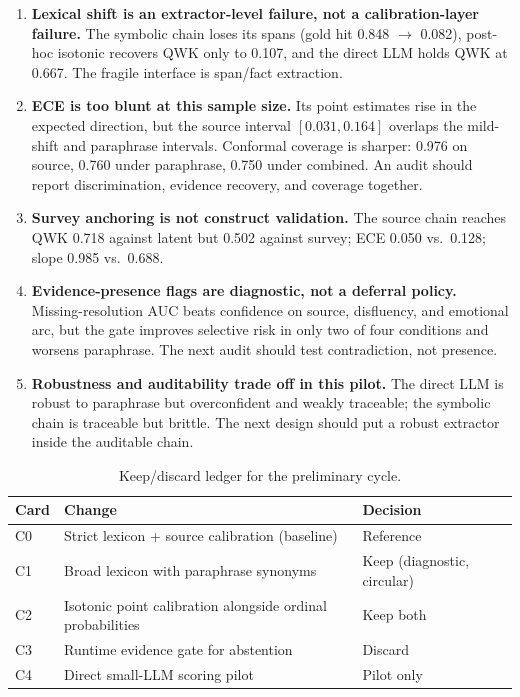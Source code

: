\documentclass[11pt,a4paper]{article}
\begin{document}
\begin{enumerate}[leftmargin=1.4em,itemsep=0.3em]
\item \textbf{Lexical shift is an extractor-level failure, not a calibration-layer failure.}
The symbolic chain loses its spans (gold hit 0.848 $\rightarrow$ 0.082), post-hoc isotonic
recovers QWK only to 0.107, and the direct LLM holds QWK at 0.667. The fragile interface is
span/fact extraction.
\item \textbf{ECE is too blunt at this sample size.} Its point estimates rise in the expected
direction, but the source interval $[0.031,0.164]$ overlaps the mild-shift and paraphrase
intervals. Conformal coverage is sharper: 0.976 on source, 0.760 under paraphrase, 0.750 under
combined. An audit should report discrimination, evidence recovery, and coverage together.
\item \textbf{Survey anchoring is not construct validation.} The source chain reaches QWK 0.718
against latent but 0.502 against survey; ECE 0.050 vs.\ 0.128; slope 0.985 vs.\ 0.688.
\item \textbf{Evidence-presence flags are diagnostic, not a deferral policy.} Missing-resolution
AUC beats confidence on source, disfluency, and emotional arc, but the gate improves selective
risk in only two of four conditions and worsens paraphrase. The next audit should test
contradiction, not presence.
\item \textbf{Robustness and auditability trade off in this pilot.} The direct LLM is robust to
paraphrase but overconfident and weakly traceable; the symbolic chain is traceable but brittle.
The next design should put a robust extractor inside the auditable chain.
\end{enumerate}

\begin{table}[t]
\centering
\caption{Keep/discard ledger for the preliminary cycle.}
\label{tab:decisions}
\begin{tabularx}{\textwidth}{@{}l X l@{}}
\toprule
Card & Change & Decision \\
\midrule
C0 & Strict lexicon + source calibration (baseline) & Reference \\
C1 & Broad lexicon with paraphrase synonyms & Keep (diagnostic, circular) \\
C2 & Isotonic point calibration alongside ordinal probabilities & Keep both \\
C3 & Runtime evidence gate for abstention & Discard \\
C4 & Direct small-LLM scoring pilot & Pilot only \\
\bottomrule
\end{tabularx}
\end{table}
\end{document}
